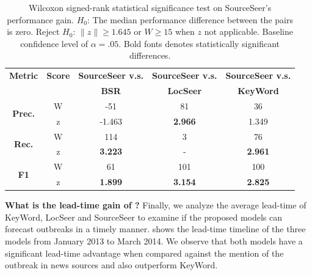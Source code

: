 \documentclass[twoside,leqno,twocolumn]{article}
\newcommand{\fullmodel}{{{\sf SourceSeer}}\xspace}
\newcommand{\locationmodel}{{\sf LocSeer}\xspace}
\newcommand{\keymodel}{{\sf KeyWord}\xspace}
\begin{document}

\begin{table}
\scriptsize \centering
\captionsetup{font=small}
\caption{Wilcoxon signed-rank statistical significance test on \fullmodel's performance gain. $H_0$: The median performance difference between the pairs is zero. Reject $H_0$: $\|z\| \geq 1.645$ or $W \geq 15$ when $z$ not applicable. Baseline confidence level of $\alpha =.05$. Bold fonts denotes statistically significant differences.}
\begin{tabular}{|c|c|c|c|c|} 
\hline
{\bf Metric} & {\bf Score} & {\bf \fullmodel v.s.} & {\bf \fullmodel v.s.} & {\bf \fullmodel v.s.} \\ 
             &             & {\bf BSR}  & {\bf \locationmodel}       & {\bf \keymodel} \\ \hline
\multirow{2}{*}{{\bf Prec.}} & W & -51 & 81 & 36\\
& z & -1.463 & {\bf 2.966} & 1.349\\ \hline
\multirow{2}{*}{{\bf Rec.}} & W & 114 & 3&76\\
& z & {\bf 3.223} & -&{\bf 2.961}\\ \hline
\multirow{2}{*}{{\bf F1}} & W & 61 & 101&100\\
& z & {\bf 1.899} & {\bf 3.154}&{\bf2.825}\\ \hline
\end{tabular}
\label{tab:significance}
\vspace{-10pt}
\end{table}

\vspace{2pt}\noindent\textbf{What is the lead-time gain of {}?} Finally, we analyze the average lead-time of \keymodel, \locationmodel and \fullmodel to examine if the proposed models can forecast outbreaks in a timely manner.  shows the lead-time timeline of the three models from January 2013 to March 2014. We observe that both models have a significant lead-time advantage when compared against  the mention of the outbreak in news sources and also outperform \keymodel.
\end{document}
